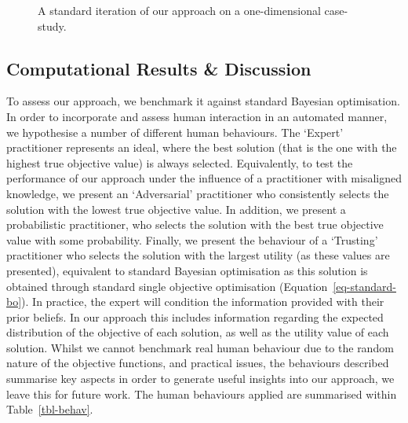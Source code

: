 \documentclass[
  letterpaper,
  DIV=11,
  numbers=noendperiod,
  oneside]{scrartcl}
\begin{document}
\begin{figure}
\begin{minipage}[t]{\linewidth}
\end{minipage}%

\caption{\label{fig-behav}A standard iteration of our approach on a
one-dimensional case-study.}

\end{figure}

\hypertarget{computational-results-discussion}{%
\subsection{Computational Results \&
Discussion}\label{computational-results-discussion}}

To assess our approach, we benchmark it against standard Bayesian
optimisation. In order to incorporate and assess human interaction in an
automated manner, we hypothesise a number of different human behaviours.
The `Expert' practitioner represents an ideal, where the best solution
(that is the one with the highest true objective value) is always
selected. Equivalently, to test the performance of our approach under
the influence of a practitioner with misaligned knowledge, we present an
`Adversarial' practitioner who consistently selects the solution with
the lowest true objective value. In addition, we present a probabilistic
practitioner, who selects the solution with the best true objective
value with some probability. Finally, we present the behaviour of a
`Trusting' practitioner who selects the solution with the largest
utility (as these values are presented), equivalent to standard Bayesian
optimisation as this solution is obtained through standard single
objective optimisation (Equation~\ref{eq-standard-bo}). In practice, the
expert will condition the information provided with their prior beliefs.
In our approach this includes information regarding the expected
distribution of the objective of each solution, as well as the utility
value of each solution. Whilst we cannot benchmark real human behaviour
due to the random nature of the objective functions, and practical
issues, the behaviours described summarise key aspects in order to
generate useful insights into our approach, we leave this for future
work. The human behaviours applied are summarised within
Table~\ref{tbl-behav}.
\end{document}
